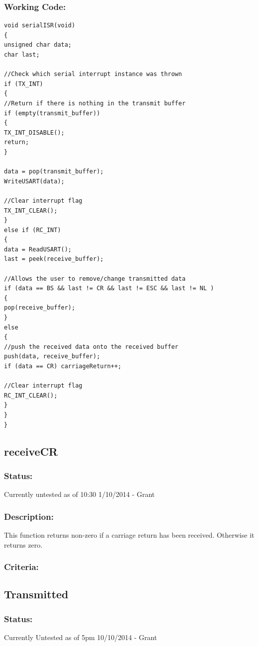 \documentclass[]{report}
\begin{document}
\subsubsection{Working Code:}
\begin{lstlisting}
void serialISR(void)
{
unsigned char data;
char last;

//Check which serial interrupt instance was thrown
if (TX_INT)
{
//Return if there is nothing in the transmit buffer
if (empty(transmit_buffer))
{
TX_INT_DISABLE();
return;
}

data = pop(transmit_buffer);
WriteUSART(data);

//Clear interrupt flag
TX_INT_CLEAR();
}
else if (RC_INT)
{
data = ReadUSART();
last = peek(receive_buffer);

//Allows the user to remove/change transmitted data
if (data == BS && last != CR && last != ESC && last != NL )
{
pop(receive_buffer);
}
else
{
//push the received data onto the received buffer
push(data, receive_buffer);
if (data == CR) carriageReturn++;

//Clear interrupt flag
RC_INT_CLEAR();
}
}
}
\end{lstlisting}

\subsection{receiveCR}
\subsubsection{Status:}
Currently untested as of 10:30 1/10/2014 - Grant

\subsubsection{Description:}
This function returns non-zero if a carriage return has been received. Otherwise it returns zero.

\subsubsection{Criteria:}

\subsection{Transmitted}
\subsubsection{Status:}
Currently Untested as of 5pm 10/10/2014 - Grant
\end{document}
